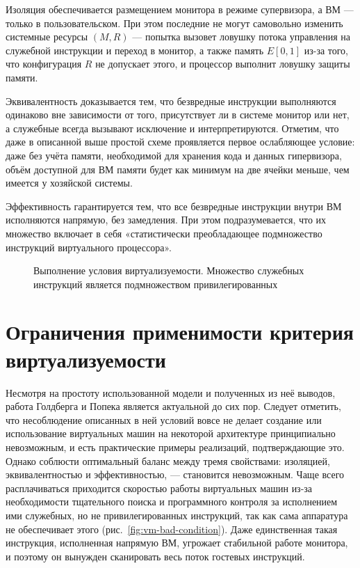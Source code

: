 \begin{itemize*}
    \item Изоляция обеспечивается размещением монитора в режиме супервизора, а ВМ — только в пользовательском. При этом последние не могут самовольно изменить системные ресурсы $(M,R)$ — попытка вызовет ловушку потока управления на служебной инструкции и переход в монитор, а также память $E[0,1]$ из-за того, что конфигурация $R$ не допускает этого, и процессор выполнит ловушку защиты памяти.
    \item Эквивалентность доказывается тем, что безвредные инструкции выполняются одинаково вне зависимости от того, присутствует ли в системе монитор или нет, а служебные всегда вызывают исключение и интерпретируются. Отметим, что даже в описанной выше простой схеме проявляется первое ослабляющее условие: даже без учёта памяти, необходимой для хранения кода и данных гипервизора, объём доступной для ВМ памяти будет как минимум на две ячейки меньше, чем имеется у хозяйской системы.
    \item Эффективность гарантируется тем, что все безвредные инструкции внутри ВМ исполняются напрямую, без замедления. При этом подразумевается, что их множество включает в себя «статистически преобладающее подмножество инструкций виртуального процессора».
\end{itemize*}

\begin{figure}[htb]
    \centering
    \caption[Выполнение условия виртуализуемости]{Выполнение условия виртуализуемости. Множество служебных инструкций является подмножеством привилегированных}
    \label{fig:vm-sufficient-condition}
\end{figure}

\section{Ограничения применимости критерия виртуализуемости}\label{sec:revising-efficiency}

Несмотря на простоту использованной модели и полученных из неё выводов, работа Голдберга и Попека является актуальной до сих пор. Следует отметить, что несоблюдение описанных в ней условий вовсе не делает создание или использование виртуальных машин на некоторой архитектуре принципиально невозможным, и есть практические примеры реализаций, подтверждающие это. Однако соблюсти оптимальный баланс между тремя свойствами: изоляцией, эквивалентностью и эффективностью, — становится невозможным. Чаще всего расплачиваться приходится скоростью работы виртуальных машин из-за необходимости тщательного поиска и программного контроля за исполнением ими служебных, но не привилегированных инструкций, так как сама аппаратура не обеспечивает этого (рис.~\ref{fig:vm-bad-condition}). Даже единственная такая инструкция, исполненная напрямую ВМ, угрожает стабильной работе монитора, и поэтому он вынужден сканировать весь поток гостевых инструкций.

